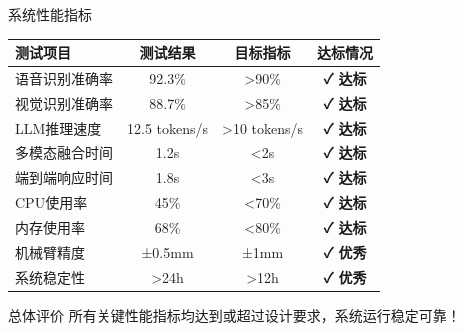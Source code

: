 \documentclass[aspectratio=169,12pt]{beamer}
\newcommand{\success}[1]{\textcolor{successgreen}{\textbf{#1}}}
\begin{document}
\begin{frame}{系统性能指标}
    \begin{table}[h]
        \centering
        \footnotesize
        \begin{tabular}{|l|c|c|c|}
        \hline
        \textbf{测试项目} & \textbf{测试结果} & \textbf{目标指标} & \textbf{达标情况} \\
        \hline
        语音识别准确率 & 92.3\% & >90\% & \success{✓ 达标} \\
        视觉识别准确率 & 88.7\% & >85\% & \success{✓ 达标} \\
        LLM推理速度 & 12.5 tokens/s & >10 tokens/s & \success{✓ 达标} \\
        多模态融合时间 & 1.2s & <2s & \success{✓ 达标} \\
        端到端响应时间 & 1.8s & <3s & \success{✓ 达标} \\
        CPU使用率 & 45\% & <70\% & \success{✓ 达标} \\
        内存使用率 & 68\% & <80\% & \success{✓ 达标} \\
        机械臂精度 & ±0.5mm & ±1mm & \success{✓ 优秀} \\
        系统稳定性 & >24h & >12h & \success{✓ 优秀} \\
        \hline
        \end{tabular}
    \end{table}
    
    \begin{alertblock}{总体评价}
        所有关键性能指标均达到或超过设计要求，系统运行稳定可靠！
    \end{alertblock}
\end{frame}
\end{document}
